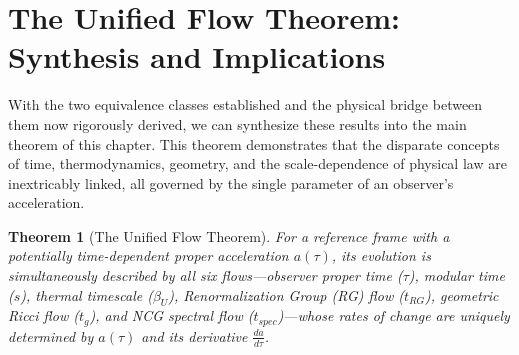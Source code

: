 \documentclass[11pt, letterpaper]{report}
\theoremstyle{plain} %
\newtheorem{theorem}{Theorem}[chapter]
\theoremstyle{definition} %
\theoremstyle{remark} %
\begin{document}
\section{The Unified Flow Theorem: Synthesis and Implications}
\label{sec:unified_flow_synthesis_final}

With the two equivalence classes established and the physical bridge between them now rigorously derived, we can synthesize these results into the main theorem of this chapter. This theorem demonstrates that the disparate concepts of time, thermodynamics, geometry, and the scale-dependence of physical law are inextricably linked, all governed by the single parameter of an observer's acceleration.

\begin{theorem}[The Unified Flow Theorem]
\label{thm:unified_flow_main_final_revised}
For a reference frame with a potentially time-dependent proper acceleration $a(\tau)$, its evolution is simultaneously described by all six flows—observer proper time ($\tau$), modular time ($s$), thermal timescale ($\beta_U$), Renormalization Group (RG) flow ($t_{RG}$), geometric Ricci flow ($t_g$), and NCG spectral flow ($t_{spec}$)—whose rates of change are uniquely determined by $a(\tau)$ and its derivative $\frac{da}{d\tau}$.
\end{theorem}
\end{document}

